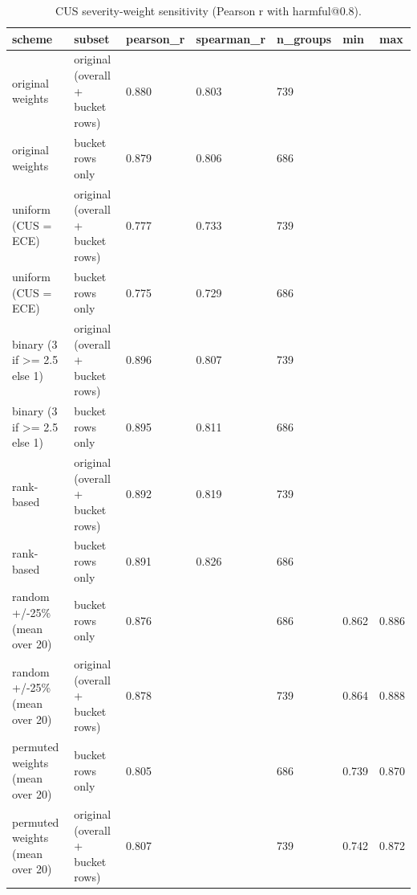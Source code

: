 \begin{table}[htbp]
\centering
\caption{CUS severity-weight sensitivity (Pearson r with harmful@0.8).}
\label{tab:rev_S4_cus_weight_sensitivity}
\begin{tabular}{lllllll}
\toprule
scheme & subset & pearson\_r & spearman\_r & n\_groups & min & max \\
\midrule
original weights & original (overall + bucket rows) & 0.880 & 0.803 & 739 &  &  \\
original weights & bucket rows only & 0.879 & 0.806 & 686 &  &  \\
uniform (CUS = ECE) & original (overall + bucket rows) & 0.777 & 0.733 & 739 &  &  \\
uniform (CUS = ECE) & bucket rows only & 0.775 & 0.729 & 686 &  &  \\
binary (3 if >= 2.5 else 1) & original (overall + bucket rows) & 0.896 & 0.807 & 739 &  &  \\
binary (3 if >= 2.5 else 1) & bucket rows only & 0.895 & 0.811 & 686 &  &  \\
rank-based & original (overall + bucket rows) & 0.892 & 0.819 & 739 &  &  \\
rank-based & bucket rows only & 0.891 & 0.826 & 686 &  &  \\
random +/-25\% (mean over 20) & bucket rows only & 0.876 &  & 686 & 0.862 & 0.886 \\
random +/-25\% (mean over 20) & original (overall + bucket rows) & 0.878 &  & 739 & 0.864 & 0.888 \\
permuted weights (mean over 20) & bucket rows only & 0.805 &  & 686 & 0.739 & 0.870 \\
permuted weights (mean over 20) & original (overall + bucket rows) & 0.807 &  & 739 & 0.742 & 0.872 \\
\bottomrule
\end{tabular}
\end{table}
